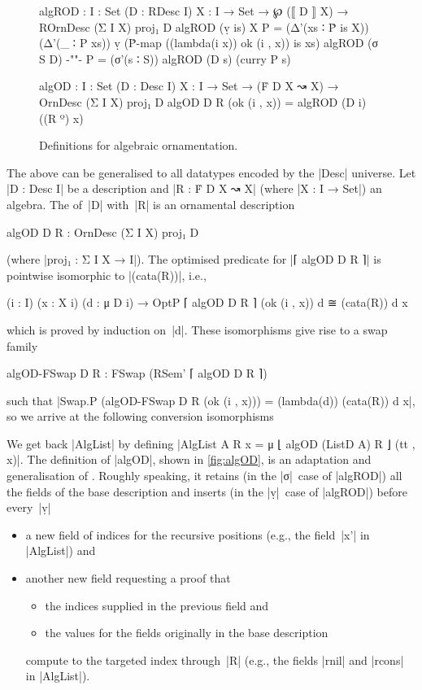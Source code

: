 \begin{figure}
\codefigure
\begin{code}
algROD :  {I : Set} (D : RDesc I) {X : I → Set} →
          ℘ (⟦ D ⟧ X) → ROrnDesc (Σ I X) proj₁ D
algROD (ṿ is)   {X}     P =  (Δ'(xs ∶ Ṗ is X)) (Δ'(_ ∶ P xs))
                               ṿ (Ṗ-map ((lambda({i} x)) ok (i , x)) is xs)
algROD (σ S D)  {-""-}  P =  (σ'(s ∶ S)) algROD (D s) (curry P s)

algOD :  {I : Set} (D : Desc I) {X : I → Set} →
         (Ḟ D X ↝ X) → OrnDesc (Σ I X) proj₁ D
algOD D R (ok (i , x)) = algROD (D i) ((R º) x)
\end{code}
\caption{Definitions for algebraic ornamentation.}
\label{fig:algOD}
\end{figure}

The above can be generalised to all datatypes encoded by the |Desc| universe.
Let |D : Desc I| be a description and |R : Ḟ D X ↝ X| (where |X : I → Set|) an algebra.
The  of~|D| with~|R| is an ornamental description
\begin{code}
algOD D R : OrnDesc (Σ I X) proj₁ D
\end{code}
(where |proj₁ : Σ I X → I|).
The optimised predicate for |⌈ algOD D R ⌉| is pointwise isomorphic to |(cata(R))|, i.e.,
\begin{code}
(i : I) (x : X i) (d : μ D i) → OptP ⌈ algOD D R ⌉ (ok (i , x)) d ≅ (cata(R)) d x
\end{code}
which is proved by induction on~|d|.
These isomorphisms give rise to a swap family
\begin{code}
algOD-FSwap D R : FSwap (RSem' ⌈ algOD D R ⌉)
\end{code}
such that |Swap.P (algOD-FSwap D R (ok (i , x))) = (lambda(d)) (cata(R)) d x|, so we arrive at the following conversion isomorphisms
We get back |AlgList| by defining |AlgList A R x = μ ⌊ algOD (ListD A) R ⌋ (tt , x)|.
The definition of |algOD|, shown in \autoref{fig:algOD}, is an adaptation and generalisation of .
Roughly speaking, it retains (in the |σ|~case of |algROD|) all the fields of the base description and inserts (in the |ṿ|~case of |algROD|) before every~|ṿ|
\begin{itemize}
\item a new field of indices for the recursive positions (e.g., the field~|x'| in |AlgList|) and
\item another new field requesting a proof that
\begin{itemize}
\item the indices supplied in the previous field and 
\item the values for the fields originally in the base description
\end{itemize}
compute to the targeted index through~|R| (e.g., the fields |rnil| and |rcons| in |AlgList|).
\end{itemize}

